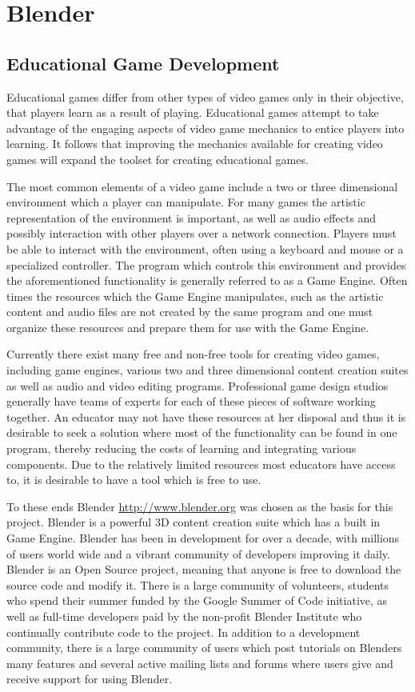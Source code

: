 \chapter{Blender}

\section{Educational Game Development}
Educational games differ from other types of video games only in their
objective, that players learn as a result of playing. Educational games attempt
to take advantage of the engaging aspects of video game mechanics to entice
players into learning. It follows that improving the mechanics available for
creating video games will expand the toolset for creating educational games.


The most common elements of a video game include a two or three dimensional
environment which a player can manipulate. For many games the artistic
representation of the environment is important, as well as audio effects and
possibly interaction with other players over a network connection. Players must
be able to interact with the environment, often using a keyboard and mouse or a
specialized controller. The program which controls this environment and
provides the aforementioned functionality is generally referred to as a Game
Engine. Often times the resources which the Game Engine manipulates, such as
the artistic content and audio files are not created by the same program and
one must organize these resources and prepare them for use with the Game
Engine.


Currently there exist many free and non-free tools for creating video games,
including game engines, various two and three dimensional content creation
suites as well as audio and video editing programs. Professional game design
studios generally have teams of experts for each of these pieces of software
working together. An educator may not have these resources at her disposal and
thus it is desirable to seek a solution where most of the functionality can be
found in one program, thereby reducing the costs of learning and integrating
various components. Due to the relatively limited resources most educators have
access to, it is desirable to have a tool which is free to use. 


To these ends Blender \url{http://www.blender.org} was chosen as the basis for this project.
Blender is a powerful 3D content creation suite which has a built in Game
Engine. Blender has been in development for over a decade, with millions of
users world wide and a vibrant community of developers improving it daily.
Blender is an Open Source project, meaning that anyone is free to download the
source code and modify it. There is a large community of volunteers, students
who spend their summer funded by the Google Summer of Code initiative, as well
as full-time developers paid by the non-profit Blender Institute who
continually contribute code to the project. In addition to a development
community, there is a large community of users which post tutorials on Blenders
many features and several active mailing lists and forums where users give and
receive support for using Blender.



